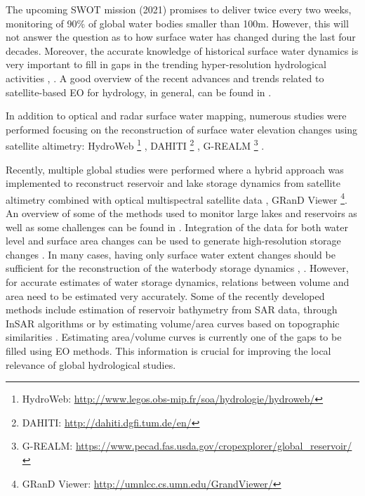 The upcoming SWOT mission (2021) promises to deliver twice every two weeks, monitoring of 90\% of global water bodies smaller than 100m. However, this will not answer the question as to how surface water has changed during the last four decades. Moreover, the accurate knowledge of historical surface water dynamics is very important to fill in gaps in the trending hyper-resolution hydrological activities \citet{wood2011hyperresolution}, \citet{bierkens2015hyper}. A good overview of the recent advances and trends related to satellite-based \gls{EO} for hydrology, in general, can be found in \citet{mccabe2017future}.

In addition to optical and radar surface water mapping, numerous studies were performed focusing on the reconstruction of surface water elevation changes using satellite altimetry: HydroWeb \footnote{HydroWeb: \url{http://www.legos.obs-mip.fr/soa/hydrologie/hydroweb/}} \citet{cretaux2005satellite}, DAHITI \footnote{DAHITI: \url{http://dahiti.dgfi.tum.de/en/}} \citet{schwatke2015dahiti}, G-REALM \footnote{G-REALM: \url{https://www.pecad.fas.usda.gov/cropexplorer/global_reservoir/}} \citet{birkett2011research}. 

Recently, multiple global studies were performed where a hybrid approach was implemented to reconstruct reservoir and lake storage dynamics from satellite altimetry combined with optical multispectral satellite data \citet{khandelwal2017approach}, GRanD Viewer \footnote{GRanD Viewer: \url{http://umnlcc.cs.umn.edu/GrandViewer/}}. An overview of some of the methods used to monitor large lakes and reservoirs as well as some challenges can be found in \citet{karpatne2016global}. Integration of the data for both water level and surface area changes can be used to generate high-resolution storage changes \cite{duan2013estimating}. In many cases, having only surface water extent changes should be sufficient for the reconstruction of the waterbody storage dynamics \citet{liebe2005estimation}, \citet{annor2009delineation}. However, for accurate estimates of water storage dynamics, relations between volume and area need to be estimated very accurately.  Some of the recently developed methods include estimation of reservoir bathymetry from \gls{SAR} data, through \gls{InSAR} algorithms \citet{amitrano2014sentinel} or by estimating volume/area curves based on topographic similarities \citet{bemmelen2016determining}. Estimating area/volume curves is currently one of the gaps to be filled using \gls{EO} methods. This information is crucial for improving the local relevance of global hydrological studies. 

